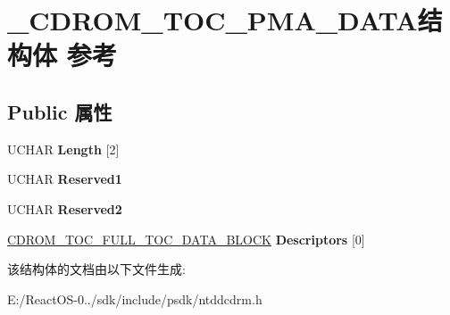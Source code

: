 \hypertarget{struct___c_d_r_o_m___t_o_c___p_m_a___d_a_t_a}{}\section{\+\_\+\+C\+D\+R\+O\+M\+\_\+\+T\+O\+C\+\_\+\+P\+M\+A\+\_\+\+D\+A\+T\+A结构体 参考}
\label{struct___c_d_r_o_m___t_o_c___p_m_a___d_a_t_a}
\subsection*{Public 属性}
\begin{DoxyCompactItemize}
\item 
\mbox{\label{struct___c_d_r_o_m___t_o_c___p_m_a___d_a_t_a_a33141211b0c737463ef3f55ce3a871ce}} 
U\+C\+H\+AR {\bfseries Length} \mbox{[}2\mbox{]}
\item 
\mbox{\label{struct___c_d_r_o_m___t_o_c___p_m_a___d_a_t_a_a5b52ab013ad1a5b5259328f12ae5b89e}} 
U\+C\+H\+AR {\bfseries Reserved1}
\item 
\mbox{\label{struct___c_d_r_o_m___t_o_c___p_m_a___d_a_t_a_af588b535e21ce862f2e9c60e2b012793}} 
U\+C\+H\+AR {\bfseries Reserved2}
\item 
\mbox{\label{struct___c_d_r_o_m___t_o_c___p_m_a___d_a_t_a_a7a5c05dec1258e2f36f72f1c72d09ad5}} 
\hyperlink{struct___c_d_r_o_m___t_o_c___f_u_l_l___t_o_c___d_a_t_a___b_l_o_c_k}{C\+D\+R\+O\+M\+\_\+\+T\+O\+C\+\_\+\+F\+U\+L\+L\+\_\+\+T\+O\+C\+\_\+\+D\+A\+T\+A\+\_\+\+B\+L\+O\+CK} {\bfseries Descriptors} \mbox{[}0\mbox{]}
\end{DoxyCompactItemize}


该结构体的文档由以下文件生成\+:\begin{DoxyCompactItemize}
\item 
E\+:/\+React\+O\+S-\/0../sdk/include/psdk/ntddcdrm.\+h\end{DoxyCompactItemize}
